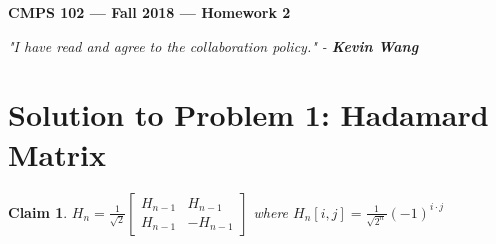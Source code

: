 \documentclass[11pt]{article}
\theoremstyle{definition}
\theoremstyle{plain}
\newtheorem{claim}{Claim}
\theoremstyle{indented-remark}
\theoremstyle{indented-proof}
\begin{document}
\begin{center}
{\bf\Large CMPS 102 --- Fall 2018 ---  Homework 2}
\end{center}

\begin{center}
\textit{"I have read and agree to the collaboration policy." - \textbf{Kevin Wang}}
\end{center}

\section*{Solution to Problem 1: Hadamard Matrix}

\begin{claim}
$H_{n} = \frac{1}{\sqrt{2}}
\begin{bmatrix} 
H_{n-1} & H_{n-1} \\
H_{n-1} & -H_{n-1} 
\end{bmatrix}$ where $H_{n}[i,j] = \frac{1}{\sqrt{2^{n}}}(-1)^{i \cdot j}$
\end{claim}
\end{document}
